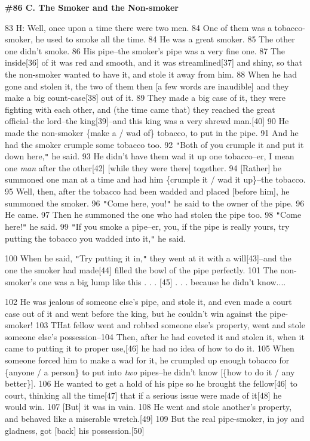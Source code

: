 
\textbf{\#86 C. The Smoker and the Non-smoker}

83 H: Well, once upon a time there were two men. 84 One of them was a tobacco-smoker,
he used to smoke all the time. 84 He was a great smoker. 85 The other one didn't
smoke. 86 His pipe--the smoker's pipe was a very fine one. 87 The inside[36] of
it was red and smooth, and it was streamlined[37] and shiny, so that the non-smoker
wanted to have it, and stole it away from him. 88 When he had gone and stolen it,
the two of them then [a few words are inaudible] and they make a big count-case[38]
out of it. 89 They made a big case of it, they were fighting with each other, and
(the time came that) they reached the great official--the lord--the king[39]--and
this king was a very shrewd man.[40] 90 He made the non-smoker \{make a / wad of\}
tobacco, to put in the pipe. 91 And he had the smoker crumple some tobacco too.
92 \texttt{"}Both of you crumple it and put it down here,\texttt{"} he said. 93
He didn't have them wad it up one tobacco--er, I mean one \textit{man} after the
other[42] [while they were there] together. 94 [Rather] he summoned one man at
a time and had him \{crumple it / wad it up\}--the tobacco. 95 Well, then, after
the tobacco had been wadded and placed [before him], he summoned the smoker. 96
\texttt{"}Come here, you!\texttt{"} he said to the owner of the pipe. 96 He came.
97 Then he summoned the one who had stolen the pipe too. 98 \texttt{"}Come here!\texttt{"}
he said. 99 \texttt{"}If you smoke a pipe--er, you, if the pipe is really yours,
try putting the tobacco you wadded into it,\texttt{"} he said.

100 When he said, \texttt{"}Try putting it in,\texttt{"} they went at it with a
will[43]--and the one the smoker had made[44] filled the bowl of the pipe perfectly.
101 The non-smoker's one was a big lump like this . . . [45] . . . because he didn't
know....

102 He was jealous of someone else's pipe, and stole it, and even made a court
case out of it and went before the king, but he couldn't win against the pipe-smoker!
103 THat fellow went and robbed someone else's property, went and stole someone
else's possession--104 Then, after he had coveted it and stolen it, when it came
to putting it to proper use,[46] he had no idea of how to do it. 105 When someone
forced him to make a wad for it, he crumpled up enough tobacco for \{anyone / a
person\} to put into \textit{two} pipes--he didn't know [\{how to do it / any better\}].
106 He wanted to get a hold of his pipe so he brought the fellow[46] to court,
thinking all the time[47] that if a serious issue were made of it[48] he would
win. 107 [But] it was in vain. 108 He went and stole another's property, and behaved
like a miserable wretch.[49] 109 But the real pipe-smoker, in joy and gladness,
got [back] his possession.[50]

